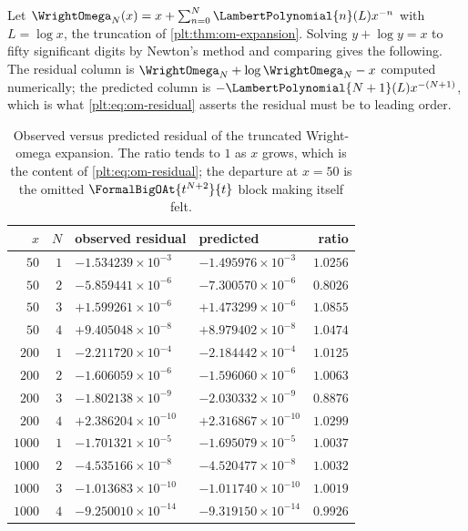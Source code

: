 \documentclass[11pt,oneside]{article}
\theoremstyle{plain}
\theoremstyle{definition}
\theoremstyle{remark}
\newcommand{\LamP}[1]{\LambertPolynomial{#1}}
\begin{document}
Let \(\WrightOmega_{N}(x)=x+\sum_{n=0}^{N}\LamP{n}(L)x^{-n}\) with
\(L=\log x\), the truncation of \cref{plt:thm:om-expansion}.  Solving
\(y+\log y=x\) to fifty significant digits by Newton's method and comparing
gives the following.  The residual column is
\(\WrightOmega_{N}+\log\WrightOmega_{N}-x\) computed numerically; the predicted
column is \(-\LamP{N+1}(L)x^{-(N+1)}\), which is what
\cref{plt:eq:om-residual} asserts the residual must be to leading order.

\begin{table}[htbp]\centering\small
\caption{Observed versus predicted residual of the truncated Wright-omega
expansion.  The ratio tends to \(1\) as \(x\) grows, which is the content of
\cref{plt:eq:om-residual}; the departure at \(x=50\) is the omitted
\(\FormalBigOAt{t^{N+2}}{t}\) block making itself felt.}
\label{plt:tab:omega-residual}
\begin{tabular}{@{}r r l l r@{}}
\toprule
\(x\) & \(N\) & observed residual & predicted & ratio\\
\midrule
$50$   & $1$ & $-1.534239\times10^{-3}$  & $-1.495976\times10^{-3}$  & $1.0256$\\
$50$   & $2$ & $-5.859441\times10^{-6}$  & $-7.300570\times10^{-6}$  & $0.8026$\\
$50$   & $3$ & $+1.599261\times10^{-6}$  & $+1.473299\times10^{-6}$  & $1.0855$\\
$50$   & $4$ & $+9.405048\times10^{-8}$  & $+8.979402\times10^{-8}$  & $1.0474$\\
\addlinespace
$200$  & $1$ & $-2.211720\times10^{-4}$  & $-2.184442\times10^{-4}$  & $1.0125$\\
$200$  & $2$ & $-1.606059\times10^{-6}$  & $-1.596060\times10^{-6}$  & $1.0063$\\
$200$  & $3$ & $-1.802138\times10^{-9}$  & $-2.030332\times10^{-9}$  & $0.8876$\\
$200$  & $4$ & $+2.386204\times10^{-10}$ & $+2.316867\times10^{-10}$ & $1.0299$\\
\addlinespace
$1000$ & $1$ & $-1.701321\times10^{-5}$  & $-1.695079\times10^{-5}$  & $1.0037$\\
$1000$ & $2$ & $-4.535166\times10^{-8}$  & $-4.520477\times10^{-8}$  & $1.0032$\\
$1000$ & $3$ & $-1.013683\times10^{-10}$ & $-1.011740\times10^{-10}$ & $1.0019$\\
$1000$ & $4$ & $-9.250010\times10^{-14}$ & $-9.319150\times10^{-14}$ & $0.9926$\\
\bottomrule
\end{tabular}
\end{table}
\end{document}
